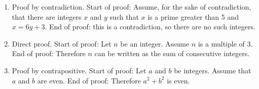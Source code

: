 \documentclass[10pt,]{book}
\theoremstyle{plain}
\theoremstyle{definition}
\theoremstyle{definition}
\theoremstyle{definition}
\theoremstyle{definition}
\numberwithin{equation}{chapter}
\begin{document}
\begin{enumerate}[label=(\alph*)]
\item\hypertarget{li-717}{}\hypertarget{p-2183}{}%
Proof by contradiction. Start of proof: Assume, for the sake of contradiction, that there are integers \(x\) and \(y\) such that \(x\) is a prime greater than 5 and \(x = 6y + 3\). End of proof: \textellipsis{} this is a contradiction, so there are no such integers.%
\item\hypertarget{li-718}{}\hypertarget{p-2184}{}%
Direct proof. Start of proof: Let \(n\) be an integer. Assume \(n\) is a multiple of 3. End of proof: Therefore \(n\) can be written as the sum of consecutive integers.%
\item\hypertarget{li-719}{}\hypertarget{p-2185}{}%
Proof by contrapositive. Start of proof: Let \(a\) and \(b\) be integers. Assume that \(a\) and \(b\) are even. End of proof: Therefore \(a^2 + b^2\) is even.%
\end{enumerate}
%
\par\smallskip
\end{document}
